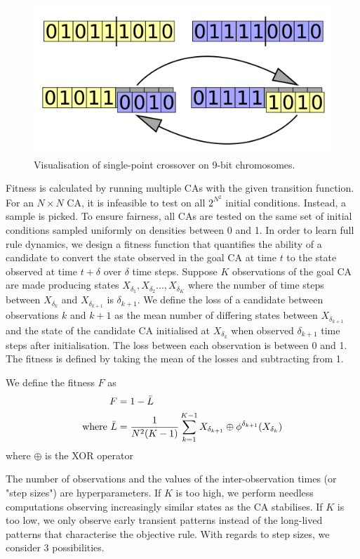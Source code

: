 \begin{figure}[!h]
\centering
    \includegraphics[width=.5\textwidth]{images/single-crossover.png}
    \caption{Visualisation of single-point crossover on 9-bit chromosomes. \cite{singlecrossover}}
\label{fig:single-crossover}
\end{figure}

Fitness is calculated by running multiple CAs with the given transition function. For an $N \times N$ CA, it is infeasible to test on all $2^{N^2}$ initial conditions. Instead, a sample is picked. To ensure fairness, all CAs are tested on the same set of initial conditions sampled uniformly on densities between 0 and 1. In order to learn full rule dynamics, we design a fitness function that quantifies the ability of a candidate to convert the state observed in the goal CA at time $t$ to the state observed at time $t+\delta$ over $\delta$ time steps. Suppose $K$ observations of the goal CA are made producing states $X_{\delta_1}, X_{\delta_2} ..., X_{\delta_K}$ where the number of time steps between $X_{\delta_k}$ and $X_{\delta_{k+1}}$ is $\delta_{k+1}$. We define the loss of a candidate between observations $k$ and $k+1$ as the mean number of differing states between $X_{\delta_{k+1}}$ and the state of the candidate CA initialised at $X_{\delta_k}$ when observed $\delta_{k+1}$ time steps after initialisation. The loss between each observation is between 0 and 1. The fitness is defined by taking the mean of the losses and subtracting from 1.

\begin{definition}
We define the fitness $F$ as
\begin{align*}
    F &= 1 - \bar{L}\\
    \textnormal{where\ } \bar{L} &= \frac{1}{N^2(K-1)}\sum_{k=1}^{K-1} X_{\delta_{k+1}} \oplus \phi^{\delta_{k+1}}(X_{\delta_k})
\end{align*}
where $\oplus$ is the XOR operator
\end{definition}

The number of observations and the values of the inter-observation times (or "step sizes") are hyperparameters. If $K$ is too high, we perform needless computations observing increasingly similar states as the CA stabilises. If $K$ is too low, we only observe early transient patterns instead of the long-lived patterns that characterise the objective rule. With regards to step sizes, we consider 3 possibilities.


